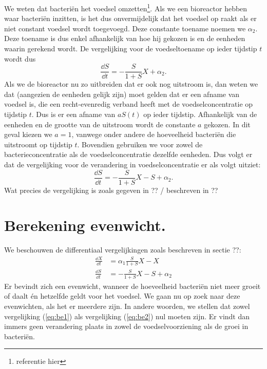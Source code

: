 We weten dat bacteri\"en het voedsel omzetten\footnote{referentie hier}. Als we een bioreactor hebben waar bacteri\"en inzitten, is het dus onvermijdelijk dat het voedsel op raakt als er niet constant voedsel wordt toegevoegd. Deze constante toename noemen we $\alpha_2$. Deze toename is dus enkel afhankelijk van hoe hij gekozen is en de eenheden waarin gerekend wordt. De vergelijking voor de voedseltoename op ieder tijdstip $t$ wordt dus
\begin{equation*}
	\frac{\dd S}{\dd t} = -\frac{S}{1 + S} X + \alpha_2.
\end{equation*}
Als we de bioreactor nu zo uitbreiden dat er ook nog uitstroom is, dan weten we dat (aangezien de eenheden gelijk zijn) moet gelden dat er een afname van voedsel is, die een recht-evenredig verband heeft met de voedselconcentratie op tijdstip $t$. Dus is er een afname van $a S(t)$ op ieder tijdstip. Afhankelijk van de eenheden en de grootte van de uitstroom wordt de constante $a$ gekozen. In dit geval kiezen we $a = 1$, vanwege onder andere de hoeveelheid bacteri\"en die uitstroomt op tijdstip $t$. Bovendien gebruiken we voor zowel de bacterieconcentratie als de voedselconcentratie dezelfde eenheden. Dus volgt er dat de vergelijking voor de verandering in voedselconcentratie er als volgt uitziet:
\begin{equation}
	\frac{\dd S}{\dd t} = -\frac{S}{1 + S} X - S + \alpha_2.
\end{equation}
Wat precies de vergelijking is zoals gegeven in ?? / beschreven in ??

\section{Berekening evenwicht.}
We beschouwen de differentiaal vergelijkingen zoals beschreven in sectie ??: %
\begin{align}
	\frac{\dd X}{\dd t} &= \alpha_1 \frac{S}{1 + S} X - X 			\label{eq:be1}	\\
	\frac{\dd S}{\dd t} &= - \frac{S}{1 + S}X - S + \alpha_2 		\label{eq:be2}
\end{align}
Er bevindt zich een evenwicht, wanneer de hoeveelheid bacteri\"en niet meer groeit of daalt \'en hetzelfde geldt voor het voedsel. We gaan nu op zoek naar deze evenwichten, als het er meerdere zijn. In andere woorden, we stellen dat zowel vergelijking (\ref{eq:be1}) als vergelijking (\ref{eq:be2}) nul moeten zijn. Er vindt dan immers geen verandering plaats in zowel de voedselvoorziening als de groei in bacteri\"en. 

